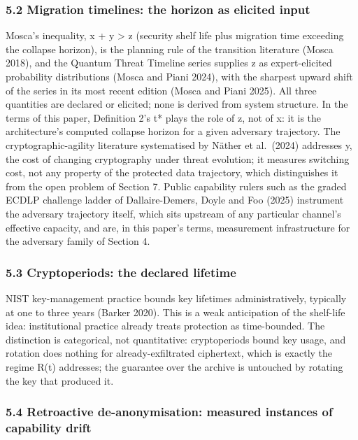 \documentclass[
]{llncs}
\begin{document}
\subsubsection{5.2 Migration timelines: the horizon as elicited
input}\label{migration-timelines-the-horizon-as-elicited-input}

Mosca's inequality, x + y \textgreater{} z (security shelf life plus
migration time exceeding the collapse horizon), is the planning rule of
the transition literature (Mosca 2018), and the Quantum Threat Timeline
series supplies z as expert-elicited probability distributions (Mosca
and Piani 2024), with the sharpest upward shift of the series in its
most recent edition (Mosca and Piani 2025). All three quantities are
declared or elicited; none is derived from system structure. In the
terms of this paper, Definition 2's t* plays the role of z, not of x: it
is the architecture's computed collapse horizon for a given adversary
trajectory. The cryptographic-agility literature systematised by Näther
et al.~(2024) addresses y, the cost of changing cryptography under
threat evolution; it measures switching cost, not any property of the
protected data trajectory, which distinguishes it from the open problem
of Section 7. Public capability rulers such as the graded ECDLP
challenge ladder of Dallaire-Demers, Doyle and Foo (2025) instrument the
adversary trajectory itself, which sits upstream of any particular
channel's effective capacity, and are, in this paper's terms,
measurement infrastructure for the adversary family of Section 4.

\subsubsection{5.3 Cryptoperiods: the declared
lifetime}\label{cryptoperiods-the-declared-lifetime}

NIST key-management practice bounds key lifetimes administratively,
typically at one to three years (Barker 2020). This is a weak
anticipation of the shelf-life idea: institutional practice already
treats protection as time-bounded. The distinction is categorical, not
quantitative: cryptoperiods bound key usage, and rotation does nothing
for already-exfiltrated ciphertext, which is exactly the regime R(t)
addresses; the guarantee over the archive is untouched by rotating the
key that produced it.

\subsubsection{5.4 Retroactive de-anonymisation: measured instances of
capability
drift}\label{retroactive-de-anonymisation-measured-instances-of-capability-drift}
\end{document}
